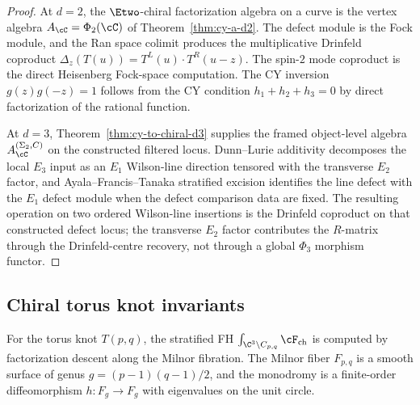 \begin{proof}
At $d = 2$, the $\Etwo$-chiral factorization algebra on a curve is the vertex algebra $A_\cC = \Phi_2(\cC)$ of Theorem~\ref{thm:cy-a-d2}. The defect module is the Fock module, and the Ran space colimit produces the multiplicative Drinfeld coproduct $\Delta_z(T(u)) = T^L(u) \cdot T^R(u - z)$. The spin-$2$ mode coproduct is the direct Heisenberg Fock-space computation. The CY inversion $g(z) g(-z) = 1$ follows from the CY condition $h_1 + h_2 + h_3 = 0$ by direct factorization of the rational function.

At $d = 3$, Theorem~\ref{thm:cy-to-chiral-d3} supplies the framed object-level algebra $A_\cC^{(\Sigma_2,C)}$ on the constructed filtered locus. Dunn--Lurie additivity decomposes the local $E_3$ input as an $E_1$ Wilson-line direction tensored with the transverse $E_2$ factor, and Ayala--Francis--Tanaka stratified excision identifies the line defect with the $E_1$ defect module when the defect comparison data are fixed. The resulting operation on two ordered Wilson-line insertions is the Drinfeld coproduct on that constructed defect locus; the transverse $E_2$ factor contributes the $R$-matrix through the Drinfeld-centre recovery, not through a global $\Phi_3$ morphism functor.
\end{proof}


\subsection{Chiral torus knot invariants}
\label{subsec:chiral-torus-knot}
\label{subsec:chiral-torus-knots}

For the torus knot $T(p, q)$, the stratified FH $\int_{\C^3 \setminus C_{p,q}} \cF_{\mathrm{ch}}$ is computed by factorization descent along the Milnor fibration. The Milnor fiber $F_{p,q}$ is a smooth surface of genus $g = (p-1)(q-1)/2$, and the monodromy is a finite-order diffeomorphism $h \colon F_g \to F_g$ with eigenvalues on the unit circle.

